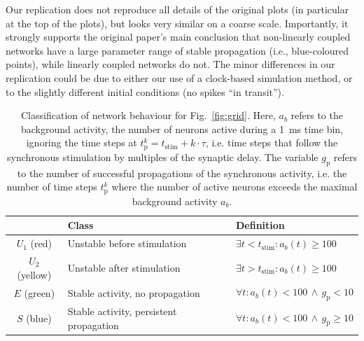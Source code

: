 \documentclass[10pt,a4paper,onecolumn]{article}
\begin{document}
Our replication does not reproduce all details of the original plots (in particular at the top of the plots), but looks very similar on a coarse scale. Importantly, it strongly supports the original paper's main conclusion that non-linearly coupled networks have a large parameter range of stable propagation (i.e., blue-coloured points), while linearly coupled networks do not. The minor differences in our replication could be due to either our use of a clock-based simulation method, or to the slightly different initial conditions (no spikes ``in transit'').
\begin{table}
\begin{tabular}{ c  l  p{}}
  \toprule
   & Class & Definition \\
  \midrule
  $U_1$ (red) & Unstable before stimulation & $\exists t<t_\text{stim}: a_b(t) \geq 100$ \\
  $U_2$ (yellow) & Unstable after stimulation & $\exists t>t_\text{stim}: a_b(t) \geq 100$ \\
  $E$ (green) &  Stable activity, no propagation & $\forall t: a_b(t) < 100\, \wedge\, g_\text{p} < 10$\\
  $S$ (blue) & Stable activity, persistent propagation & $\forall t: a_b(t) < 100\, \wedge\, g_\text{p} \geq 10$\\
  \bottomrule
\end{tabular}
\caption{Classification of network behaviour for Fig.~\ref{fig:grid}. Here, $a_b$ refers to the background activity, the number of neurons active during a \SI{1}{\milli\second} time bin, ignoring the time steps at $t_\text{p}^k = t_\text{stim} + k\cdot\tau$, i.e. time steps that follow the synchronous stimulation by multiples of the synaptic delay. The variable $g_\text{p}$ refers to the number of successful propagations of the synchronous activity, i.e. the number of time steps $t_\text{p}^k$ where the number of active neurons exceeds the maximal background activity $a_b$.}\label{tab:color}
\end{table}
\end{document}
